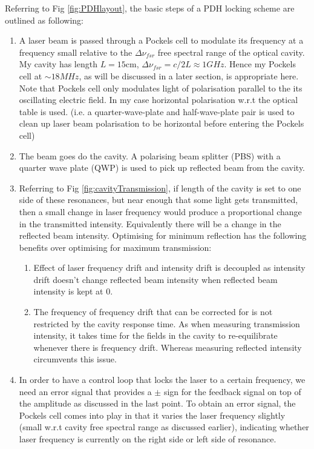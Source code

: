 \documentclass[12pt]{report}
\begin{document}
Referring to Fig \ref{fig:PDHlayout}, the basic steps of a PDH locking scheme are outlined as following: 
\begin{enumerate}
    \item A laser beam is passed through a Pockels cell to modulate its frequency at a frequency small relative to the $\Delta \nu_{fsr}$ free spectral range of the optical cavity. My cavity has length $L=15$cm, $\Delta \nu_{fsr} = c/2L \approx 1GHz$. Hence my Pockels cell at $\sim 18 MHz$, as will be discussed in a later section, is appropriate here. Note that Pockels cell only modulates light of polarisation parallel to the its oscillating electric field. In my case horizontal polarisation w.r.t the optical table is used. (i.e. a quarter-wave-plate and half-wave-plate pair is used to clean up laser beam polarisation to be horizontal before entering the Pockels cell) 

    \item The beam goes do the cavity. A polarising beam splitter (PBS) with a quarter wave plate (QWP) is used to pick up reflected beam from the cavity.

    \item Referring to Fig \ref{fig:cavityTransmission}, if length of the cavity is set to one side of these resonances, but near enough that some light gets transmitted, then a small change in laser frequency would produce a proportional change in the transmitted intensity. Equivalently there will be a change in the reflected beam intensity. Optimising for minimum reflection has the following benefits over optimising for maximum transmission: 
    \begin{enumerate}
        \item Effect of laser frequency drift and intensity drift is decoupled as intensity drift doesn't change reflected beam intensity when reflected beam intensity is kept at 0.
        \item The frequency of frequency drift that can be corrected for is not restricted by the cavity response time. As when measuring transmission intensity, it takes time for the fields in the cavity to re-equilibrate whenever there is frequency drift. Whereas measuring reflected intensity circumvents this issue. 
    \end{enumerate}

    \item In order to have a control loop that locks the laser to a certain frequency, we need an error signal that provides a $\pm$ sign for the feedback signal on top of the amplitude as discussed in the last point. To obtain an error signal, the Pockels cell comes into play in that it varies the laser frequency slightly (small w.r.t cavity free spectral range as discussed earlier), indicating whether laser frequency is currently on the right side or left side of resonance. 


\end{enumerate}
\end{document}
